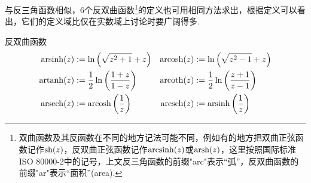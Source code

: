 \documentclass[main.tex]{subfiles}
\begin{document}
与反三角函数相似，6个反双曲函数\footnote{双曲函数及其反函数在不同的地方记法可能不同，例如有的地方把双曲正弦函数记作\({\rm sh}(z)\)，反双曲正弦函数记作\({\rm arcsinh}(z)\)或\({\rm arsh}(z)\)，这里按照国际标准ISO 80000-2中的记号，上文反三角函数的前缀"arc"表示“弧”，反双曲函数的前缀"ar"表示“面积”(area).}的定义也可用相同方法求出，根据定义可以看出，它们的定义域比仅在实数域上讨论时要广阔得多.
\begin{definition}{反双曲函数}
    \[
        \begin{aligned}
            {\rm arsinh}(z) &:= \ln\left(\sqrt{z^2+1}+z\right) & {\rm arcosh}(z) &:= \ln\left(\sqrt{z^2-1}+z\right) \\
            {\rm artanh}(z) &:= \frac{1}{2}\ln\left(\frac{1+z}{1-z}\right) & {\rm arcoth}(z) &:= \frac{1}{2}\ln\left(\frac{z+1}{z-1}\right) \\
            {\rm arsech}(z) &:= {\rm arcosh}\left(\frac{1}{z}\right) & {\rm arcsch}(z) &:= {\rm arsinh}\left(\frac{1}{z}\right)
        \end{aligned}
    \]
\end{definition}
\end{document}
